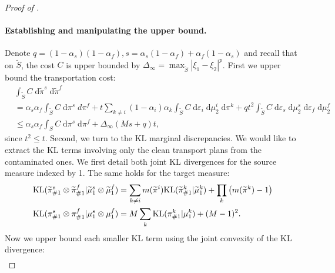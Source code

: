 \begin{proof}[Proof of ]
  \paragraph{Establishing and manipulating the upper bound.}
  Denote $q = (1 - \alpha_s)(1 - \alpha_f), s = \alpha_s (1-\alpha_f) + \alpha_f (1 - \alpha_s)$
  and recall that on $\widetilde{S}$, the cost $C$ is upper bounded by
  $\Delta_{\infty} = \max_{\widetilde{S}}|\xi_1 - \xi_2|^p$.
  First we upper bound the transportation cost:
  \begin{equation}
    \label{seq:cost-split}
    \begin{split}
      &\int_{\widetilde{S}} C \; \mathrm d\widetilde{\pi}^s \; \mathrm d\widetilde{\pi}^f \\
      &= \alpha_s\alpha_f\int_{\widetilde{S}} C \; \mathrm d\pi^s \; d\pi^f +
      t \sum_{k \neq i} (1-\alpha_i) \alpha_k \int_{\widetilde{S}} C \;
      \mathrm d \varepsilon_i \; \mathrm d\mu^i_2  \; \mathrm d\pi^k +
      q t^2 \int_{\widetilde{S}} C \; \mathrm d \varepsilon_s \; \mathrm d\mu_2^s \;
      \mathrm d\varepsilon_f \; \mathrm d\mu^f_2 \\
      &\leq \alpha_s\alpha_f \int_{S} C \; \mathrm d\pi^s \;\mathrm d\pi^f +
      \Delta_{\infty}(Ms + q)t,
    \end{split}
  \end{equation}
  since $t^2 \leq t$. Second, we turn to the KL marginal discrepancies.
  We would like to extract the KL terms involving only the clean transport plans from
  the contaminated ones. We first detail both joint KL divergences for the source measure
  indexed by 1. The same holds for the target measure:
  \begin{equation}
  \label{seq:kl-split}
  \begin{split}
    &\text{KL}(\widetilde{\pi}^s_{\#1} \otimes \widetilde{\pi}^f_{\#1} \vert \widetilde{\mu}^s_1 \otimes \widetilde{\mu}^f_1) =
    \sum_{k \neq i} m(\widetilde{\pi}^i) \text{KL}(\widetilde{\pi}^k_{\#1} \vert \widetilde{\mu}^k_1) +
    \prod_{k} \big( m(\widetilde{\pi}^k) - 1 \big)\\
    &
    \text{KL}(\pi^s_{\#1} \otimes \pi^f_{\#1} \vert \mu^s_1 \otimes \mu^f_1) =
  M \sum_k \text{KL}(\pi^k_{\#1} \vert \mu^k_1) + (M-1)^2.
    \end{split}
  \end{equation}
  Now we upper bound each smaller KL term using the joint convexity of the KL divergence:
  \begin{equation}
    \begin{split}

\end{split}
\end{equation}
\end{proof}
